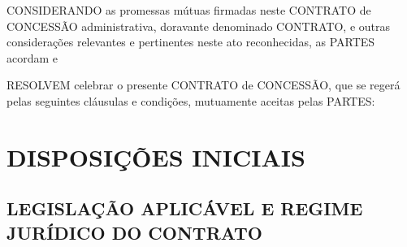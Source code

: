 \documentclass[a4paper,11pt]{report} %
\begin{document}
CONSIDERANDO as promessas mútuas firmadas neste CONTRATO de CONCESSÃO administrativa, doravante denominado CONTRATO, e outras considerações relevantes e pertinentes neste ato reconhecidas, as PARTES acordam e

RESOLVEM celebrar o presente CONTRATO de CONCESSÃO, que se regerá pelas seguintes cláusulas e condições, mutuamente aceitas pelas PARTES:

\chapter{DISPOSIÇÕES INICIAIS}
\section{LEGISLAÇÃO APLICÁVEL E REGIME JURÍDICO DO CONTRATO}
\label{sec:PAHT}
\end{document}
